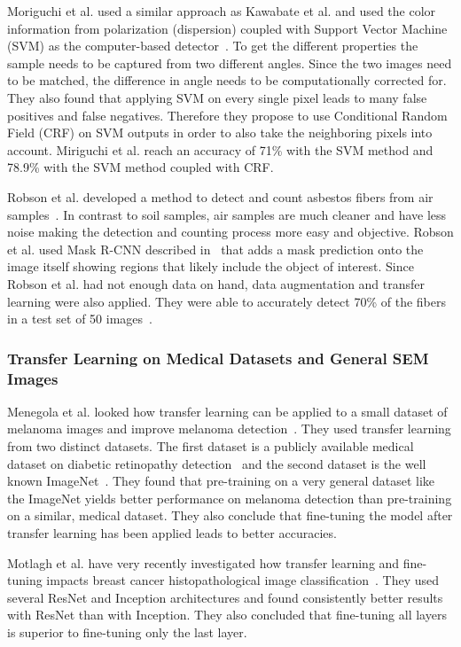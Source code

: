 Moriguchi et al. used a similar approach as Kawabate et al. and used the color information from polarization (dispersion) coupled with Support Vector Machine (SVM) as the computer-based detector~\cite{moriguchi2008asbestos}. To get the different properties the sample needs to be captured from two different angles. Since the two images need to be matched, the difference in angle needs to be computationally corrected for. They also found that applying SVM on every single pixel leads to many false positives and false negatives. Therefore they propose to use Conditional Random Field (CRF) on SVM outputs in order to also take the neighboring pixels into account. Miriguchi et al. reach an accuracy of 71\% with the SVM method and 78.9\% with the SVM method coupled with CRF.

Robson et al. developed a method to detect and count asbestos fibers from air samples~\cite{robson2018fiac}. In contrast to soil samples, air samples are much cleaner and have less noise making the detection and counting process more easy and objective. Robson et al. used Mask R-CNN described in~\cite{he2017mask} that adds a mask prediction onto the image itself showing regions that likely include the object of interest. Since Robson et al. had not enough data on hand, data augmentation and transfer learning were also applied. They were able to accurately detect 70\% of the fibers in a test set of 50 images~\cite{robson2018fiac}. \\

\subsubsection{Transfer Learning on Medical Datasets and General SEM Images}

Menegola et al. looked how transfer learning can be applied to a small dataset of melanoma images and improve melanoma detection~\cite{menegola2017knowledge}. They used transfer learning from two distinct datasets. The first dataset is a publicly available medical dataset on diabetic retinopathy detection~\cite{diabeticRetinopathy} and the second dataset is the well known ImageNet~\cite{imagenet}. They found that pre-training on a very general dataset like the ImageNet yields better performance on melanoma detection than pre-training on a similar, medical dataset. They also conclude that fine-tuning the model after transfer learning has been applied leads to better accuracies.

Motlagh et al. have very recently investigated how transfer learning and fine-tuning impacts breast cancer histopathological image classification~\cite{motlagh2018breast}. They used several ResNet and Inception architectures and found consistently better results with ResNet than with Inception. They also concluded that fine-tuning all layers is superior to fine-tuning only the last layer.

